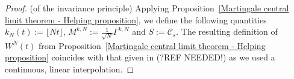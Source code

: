 \begin{proof}(of the invariance principle)
 Applying Proposition~\ref{Martingale central limit theorem - Helping proposition}, we define the following quantities $ k_N(t) := \lfloor Nt \rfloor $, $ M^{k,N} := \frac{1}{\sqrt{N}} \Gamma^{k,N} $ and $ S := \mathcal{C}_s $.  The resulting definition of $ W^{N}(t) $ from Proposition~\ref{Martingale central limit theorem - Helping proposition} coincides with that given in (?REF NEEDED!) as we used a continuous, linear interpolation.
\end{proof}

